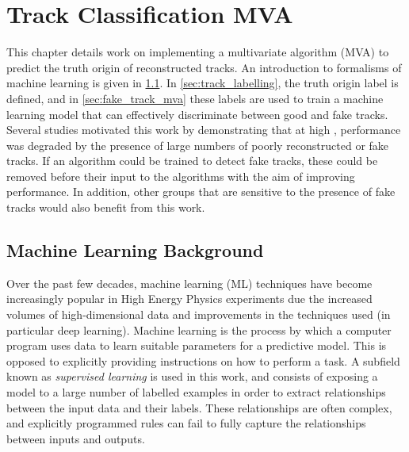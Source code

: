 \chapter{Track Classification MVA}\label{chap:track_classification_mva}

This chapter details work on implementing a multivariate algorithm (MVA) to predict the truth origin of reconstructed tracks.
An introduction to formalisms of machine learning is given in \cref{sec:ml_background}.
In \cref{sec:track_labelling}, the truth origin label is defined, and in \cref{sec:fake_track_mva} these labels are used to train a machine learning model that can effectively discriminate between good and fake tracks.
Several studies motivated this work by demonstrating that at high \pt, \btagging performance was degraded by the presence of large numbers of poorly reconstructed or fake tracks.
If an algorithm could be trained to detect fake tracks, these could be removed before their input to the \btagging algorithms with the aim of improving performance.
In addition, other groups that are sensitive to the presence of fake tracks would also benefit from this work.


\section{Machine Learning Background}\label{sec:ml_background}

Over the past few decades, machine learning (ML) techniques have become increasingly popular in High Energy Physics experiments due the increased volumes of high-dimensional data and improvements in the techniques used (in particular deep learning).
Machine learning is the process by which a computer program uses data to learn suitable parameters for a predictive model.
This is opposed to explicitly providing instructions on how to perform a task.
A subfield known as \textit{supervised learning} is used in this work, and consists of exposing a model to a large number of labelled examples in order to extract relationships between the input data and their labels.
These relationships are often complex, and explicitly programmed rules can fail to fully capture the relationships between inputs and outputs.


